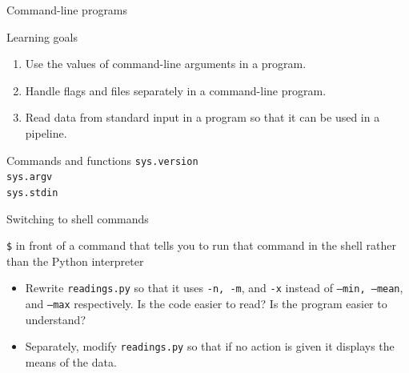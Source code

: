 \documentclass{beamer}
\begin{document}

\begin{frame}{Command-line programs}
\begin{block}{Learning goals}
\begin{enumerate}
       \item{Use the values of command-line arguments in a program.}
    \item{Handle flags and files separately in a command-line program.}
    \item{Read data from standard input in a program so that it can be used in a pipeline.}
 \end{enumerate}
 \end{block}
 \begin{block}{Commands and functions}
  \texttt{sys.version \\
  sys.argv\\
  sys.stdin}
 \end{block}
\end{frame}



\begin{frame}{Switching to shell commands}

 \textcolor{verde}{\texttt{\$}} in front of a command that tells you to run that command in the shell rather than the Python interpreter
%

\end{frame}


\begin{frame}{ }
\begin{itemize}
\item Rewrite \texttt{readings.py} so that it uses \texttt{-n, -m}, and \texttt{-x} instead of \texttt{--min, --mean}, and \texttt{--max} respectively. Is the code easier to read? Is the program easier to understand?


\item Separately, modify \texttt{readings.py} so that if no action is given it displays the means of the data.
\end{itemize}
\end{frame}



\end{document}
